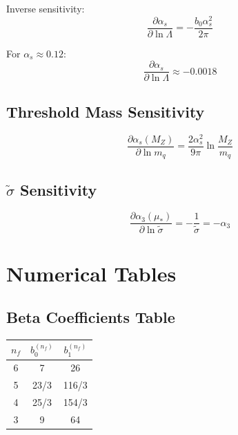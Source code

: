 \documentclass[11pt,a4paper]{article}
\theoremstyle{definition}
\begin{document}
Inverse sensitivity:
\begin{equation}
\label{eq:app-84}
\frac{\partial\alpha_s}{\partial\ln\Lambda} = -\frac{b_0\alpha_s^2}{2\pi}
\end{equation}

For $\alpha_s \approx 0.12$:
\begin{equation}
\label{eq:app-85}
\frac{\partial\alpha_s}{\partial\ln\Lambda} \approx -0.0018
\end{equation}

\subsection{Threshold Mass Sensitivity}
\label{subsec:app-sens-thresh}

\begin{equation}
\label{eq:app-86}
\frac{\partial\alpha_s(M_Z)}{\partial\ln m_q} = \frac{2\alpha_s^2}{9\pi}\ln\frac{M_Z}{m_q}
\end{equation}

\subsection{$\tilde{\sigma}$ Sensitivity}
\label{subsec:app-sens-sigma}

\begin{equation}
\label{eq:app-87}
\frac{\partial\alpha_3(\mu_*)}{\partial\ln\tilde{\sigma}} = -\frac{1}{\tilde{\sigma}} = -\alpha_3
\end{equation}

\section{Numerical Tables}
\label{app:tables}

\subsection{Beta Coefficients Table}
\label{subsec:app-table-beta}

\begin{center}
\begin{tabular}{ccc}
\toprule
$n_f$ & $b_0^{(n_f)}$ & $b_1^{(n_f)}$ \\
\midrule
6 & 7 & 26 \\
5 & 23/3 & 116/3 \\
4 & 25/3 & 154/3 \\
3 & 9 & 64 \\
\bottomrule
\end{tabular}
\end{center}
\end{document}
